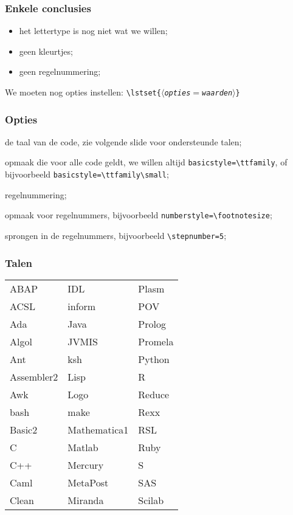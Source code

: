 \begin{frame}
  \frametitle{Enkele conclusies}

  \begin{itemize}
    \item het lettertype is nog niet wat we willen;
    \item geen kleurtjes;
    \item geen regelnummering;
  \end{itemize}

  We moeten nog opties instellen:
  \texttt{\textcolor{uagreen}{\textbackslash lstset}\{$\langle$\textsl{opties$=$waarden}$\rangle$\}}
\end{frame}

\begin{frame}[fragile]
  \frametitle{Opties}

  \begin{description}
    \item[\texttt{language}] de taal van de code, zie volgende slide voor ondersteunde talen;
    \item[\texttt{basicstyle}] opmaak die voor alle code geldt, we willen altijd \verb|basicstyle=\ttfamily|, of bijvoorbeeld \verb|basicstyle=\ttfamily\small|;
    \item[\texttt{numbers}] regelnummering;
    \item[\texttt{numberstyle}] opmaak voor regelnummers, bijvoorbeeld \verb|numberstyle=\footnotesize|;
    \item[\texttt{stepnumber}] sprongen in de regelnummers, bijvoorbeeld \verb|\stepnumber=5|;
  \end{description}
\end{frame}

\begin{frame}
  \frametitle{Talen}

  \small
  \begin{tabular}{lll}
    ABAP & IDL & Plasm           \\
    ACSL & inform & POV         \\
    Ada & Java & Prolog         \\
    Algol & JVMIS & Promela     \\
    Ant & ksh & Python          \\
    Assembler2 & Lisp & R       \\
    Awk & Logo & Reduce         \\
    bash & make & Rexx          \\
    Basic2 & Mathematica1 & RSL \\
    C & Matlab & Ruby           \\
    C++ & Mercury & S           \\
    Caml & MetaPost & SAS       \\
    Clean & Miranda & Scilab    \\
  \end{tabular}
\end{frame}

